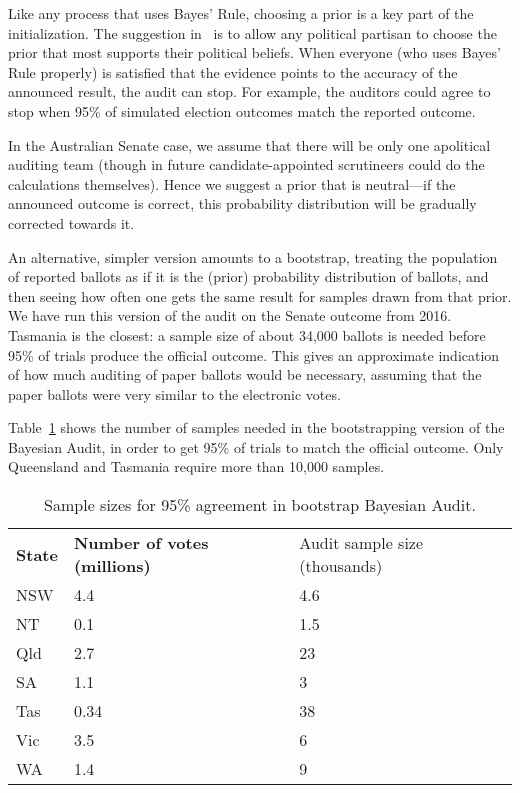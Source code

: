 \documentclass[10pt,a4paper]{article}
\begin{document}
Like any process that uses Bayes' Rule, choosing a prior is a key part
of the initialization.  The suggestion in~\cite{rivest2012bayesian} is
to allow any political partisan to choose the prior that most supports
their political beliefs.  When everyone (who uses Bayes' Rule
properly) is satisfied that the evidence points to the accuracy of the
announced result, the audit can stop.  For example, the auditors could
agree to stop when 95\% of simulated election outcomes match the
reported outcome.

In the Australian Senate case, we assume that there will be only one
apolitical auditing team (though in future candidate-appointed
scrutineers could do the calculations themselves).  Hence we suggest a
prior that is neutral---if the announced outcome is correct, this
probability distribution will be gradually corrected towards it.

An alternative, simpler version amounts to a bootstrap, treating the
population of reported ballots as if it is the (prior) probability
distribution of ballots, and then seeing how often one gets the same
result for samples drawn from that prior.  We have run this version of the audit 
on the Senate outcome from 2016.  Tasmania is the closest: a sample size of about 
34,000 ballots is needed before 95\% of trials produce the official outcome.  This gives an approximate
indication of how much auditing of paper ballots would be necessary, assuming that 
the paper ballots were very similar to the electronic votes.

Table~\ref{tab:bootstrapping} shows the number of samples needed in the bootstrapping version of the Bayesian Audit, in order to get 95\% of trials to match the official outcome. Only Queensland and Tasmania require more than 10,000 samples.

\begin{table}
\begin{tabular}{lll}
{\bf State} & {\bf Number of votes (millions)} & {Audit sample size (thousands)} \\
NSW & 4.4 & 4.6 \\
NT & 0.1 & 1.5 \\
Qld & 2.7 & 23 \\
SA & 1.1 & 3 \\
Tas & 0.34 & 38 \\
Vic & 3.5 & 6 \\
WA  & 1.4 & 9 \\
\end{tabular}
\caption{Sample sizes for 95\% agreement in bootstrap Bayesian Audit.}
\label{tab:bootstrapping}
\end{table}
\end{document}
